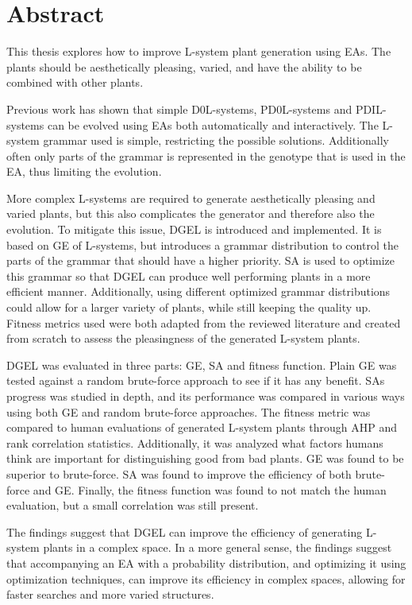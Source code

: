 \chapter*{Abstract}

This thesis explores how to improve L-system plant generation using \glspl{EA}.
The plants should be aesthetically pleasing, varied, and have the ability to be combined with other plants.

Previous work has shown that simple \glspl{D0L-system}, \glspl{PD0L-system} and \glspl{PDIL-system} can be evolved using \glspl{EA} both automatically and interactively.
The \gls{L-system} grammar used is simple, restricting the possible solutions.
Additionally often only parts of the grammar is represented in the genotype that is used in the \gls{EA}, thus limiting the evolution.

More complex \glspl{L-system} are required to generate aesthetically pleasing and varied plants, but this also complicates the generator and therefore also the evolution.
To mitigate this issue, \gls{DGEL} is introduced and implemented.
It is based on \gls{GE} of \glspl{L-system}, but introduces a grammar distribution to control the parts of the grammar that should have a higher priority.
\Gls{SA} is used to optimize this grammar so that \gls{DGEL} can produce well performing plants in a more efficient manner.
Additionally, using different optimized grammar distributions could allow for a larger variety of plants, while still keeping the quality up.
Fitness metrics used were both adapted from the reviewed literature and created from scratch to assess the pleasingness of the generated L-system plants.

\Gls{DGEL} was evaluated in three parts: \gls{GE}, \gls{SA} and fitness function.
Plain \gls{GE} was tested against a random brute-force approach to see if it has any benefit.
\Gls{SA}s progress was studied in depth, and its performance was compared in various ways using both \gls{GE} and random brute-force approaches.
The fitness metric was compared to human evaluations of generated L-system plants through \gls{AHP} and rank correlation statistics.
Additionally, it was analyzed what factors humans think are important for distinguishing good from bad plants.
\Gls{GE} was found to be superior to brute-force.
\Gls{SA} was found to improve the efficiency of both brute-force and \gls{GE}.
Finally, the fitness function was found to not match the human evaluation, but a small correlation was still present.

The findings suggest that \gls{DGEL} can improve the efficiency of generating L-system plants in a complex space. In a more general sense, the findings suggest that accompanying an EA with a probability distribution, and optimizing it using optimization techniques, can improve its efficiency in complex spaces, allowing for faster searches and more varied structures.

\hypersetup{pageanchor=false}
